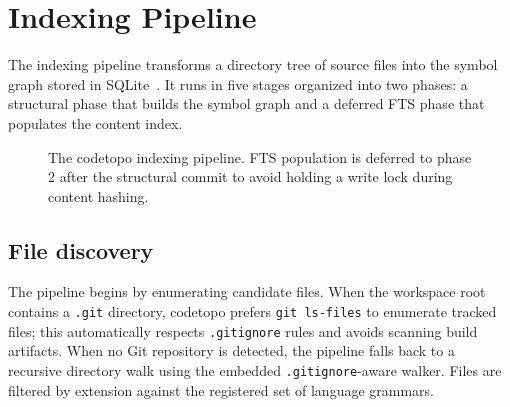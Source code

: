 \section{Indexing Pipeline}
\label{sec:indexing-pipeline}

The indexing pipeline transforms a directory tree of source files into the
symbol graph stored in SQLite~\cite{brunsfeld2018treesitter}. It runs in five
stages organized into two phases: a structural phase that builds the symbol
graph and a deferred FTS phase that populates the content index.

\begin{figure}[htbp]
\centering
{}
\caption{The codetopo indexing pipeline. FTS population is deferred to phase 2
         after the structural commit to avoid holding a write lock during
         content hashing.}
\label{fig:pipeline}
\end{figure}

\subsection{File discovery}

The pipeline begins by enumerating candidate files. When the workspace root
contains a \texttt{.git} directory, codetopo prefers \texttt{git ls-files} to
enumerate tracked files; this automatically respects \texttt{.gitignore} rules
and avoids scanning build artifacts. When no Git repository is detected, the
pipeline falls back to a recursive directory walk using the embedded
\texttt{.gitignore}-aware walker. Files are filtered by extension against the
registered set of language grammars.

